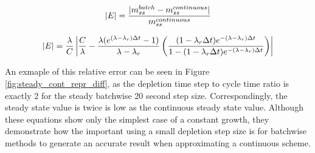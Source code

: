 \begin{equation} \hfill 
|E| = \frac{|m_{ss}^{batch} - m_{ss}^{continuous}|}{m_{ss}^{continuous}}
\hfill\label{eq:ss-err-1} \end{equation}



\begin{equation} \hfill 
|E| = \frac{\lambda}{C} \left| \frac{C}{\lambda}  - \frac{\lambda (e^{(\lambda - \lambda_r) \Delta t} - 1)}{\lambda - \lambda_r}  \left( \frac{(1 - \lambda_r \Delta t) e^{-(\lambda - \lambda_r) \Delta t}}{1 - (1 - \lambda_r \Delta t) e^{-(\lambda - \lambda_r) \Delta t}} \right) \right|
\hfill\label{eq:ss-err-4} \end{equation}

An exmaple of this relative error can be seen in Figure \ref{fig:steady_cont_repr_diff}, as the depletion time step to cycle time ratio is exactly 2 for the steady batchwise 20 second step size. Correspondingly, the steady state value is twice is low as the continuous steady state value. Although these equations show only the simplest case of a constant growth, they demonstrate how the important using a small depletion step size is for batchwise methods to generate an accurate result when approximating a continuous scheme.

